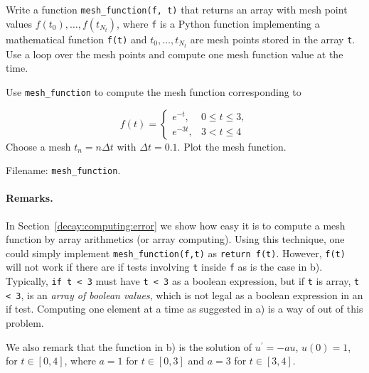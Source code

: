 \documentclass[graybox,sectrefs,envcountresetchap,open=right,final]{svmonodo}
\makeatletter
\newenvironment{doconceexercise}{}{}
\newcounter{doconceexercisecounter}%
\newcommand\listofexercises{
\chapter*{List of Exercises, Problems, and Projects
          \@mkboth{List of Exercises, Problems, and Projects}{List of Exercises, Problems, and Projects}}
\markboth{List of Exercises, Problems, and Projects}{List of Exercises, Problems, and Projects}
\@starttoc{loe}
}
\makeatother
\begin{document}
\begin{doconceexercise}

                
\label{decay:exer:meshfunc}

Write a function \Verb!mesh_function(f, t)! that returns an array with
mesh point values $f(t_0),\ldots,f(t_{N_t})$, where \texttt{f} is a Python
function implementing a mathematical function \texttt{f(t)} and $t_0,\ldots,t_{N_t}$
are mesh points stored in the array \texttt{t}. Use a loop over the mesh
points and compute one mesh function value at the time.



Use \Verb!mesh_function! to compute the mesh function corresponding to

\[
f(t) = \left\lbrace
\begin{array}{ll}
e^{-t},& 0\leq t\leq 3,\\ 
e^{-3t}, & 3 < t\leq 4
\end{array}\right.
\]
Choose a mesh $t_n=n\Delta t$ with $\Delta t=0.1$.
Plot the mesh function.



\noindent Filename: \Verb!mesh_function!.


\paragraph{Remarks.}
In Section~\ref{decay:computing:error} we show how easy it is to
compute a mesh function by array arithmetics (or array computing).
Using this technique, one could simply implement \Verb!mesh_function(f,t)!
as \texttt{return f(t)}. However, \texttt{f(t)} will not work if there are
if tests involving \texttt{t} inside \texttt{f} as is the case in b). Typically,
\texttt{if t < 3} must have \texttt{t < 3} as a boolean expression, but if \texttt{t} is
array, \texttt{t < 3}, is an \emph{array of boolean values}, which is not legal
as a boolean expression in an if test.
Computing one element
at a time as suggested in a) is a way of out of this problem.

We also remark that the function in b) is the solution of $u^{\prime}=-au$,
$u(0)=1$, for $t\in [0,4]$, where $a=1$ for $t\in [0,3]$ and $a=3$ for
$t\in [3,4]$.

\end{doconceexercise}
\end{document}
